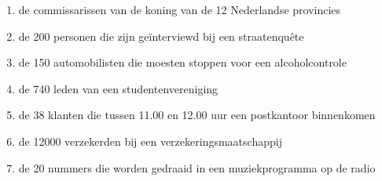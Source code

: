 \begin{enumerate}[label=(\alph*)]
    \item de commissarissen van de koning van de 12 Nederlandse provincies
    \item de 200 personen die zijn ge\"interviewd bij een straatenqu\^ete
    \item de 150 automobilisten die moesten stoppen voor een alcoholcontrole
    \item de 740 leden van een studentenvereniging
    \item de 38 klanten die tussen 11.00 en 12.00 uur een postkantoor binnenkomen
    \item de 12000 verzekerden bij een verzekeringsmaatschappij
    \item de 20 nummers die worden gedraaid in een muziekprogramma op de radio
\end{enumerate}

